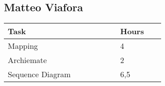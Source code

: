 \subsection{Matteo Viafora}
\begin{center}
\centering
    \begin{tabular}{@{}p{0.5\linewidth} p{0.2\linewidth}@{}}
        \hline
        \textbf{Task} & \textbf{Hours} \\ \hline
        Mapping & 4 \\ \hline
        Archiemate & 2 \\ \hline
        Sequence Diagram & 6,5\\ \hline
    \end{tabular}
\end{center}